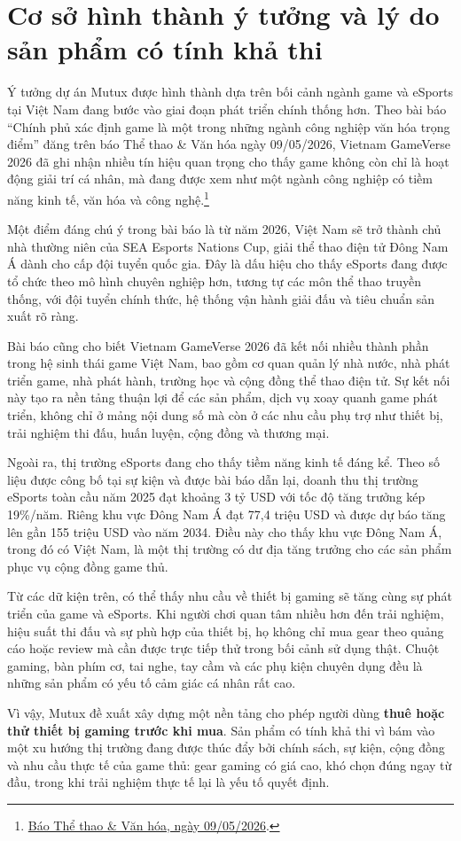 \section{Cơ sở hình thành ý tưởng và lý do sản phẩm có tính khả thi}

Ý tưởng dự án Mutux được hình thành dựa trên bối cảnh ngành game và eSports tại Việt Nam đang bước vào giai đoạn phát triển chính thống hơn. Theo bài báo ``Chính phủ xác định game là một trong những ngành công nghiệp văn hóa trọng điểm'' đăng trên báo Thể thao \& Văn hóa ngày 09/05/2026, Vietnam GameVerse 2026 đã ghi nhận nhiều tín hiệu quan trọng cho thấy game không còn chỉ là hoạt động giải trí cá nhân, mà đang được xem như một ngành công nghiệp có tiềm năng kinh tế, văn hóa và công nghệ.\footnote{\href{https://thethaovanhoa.vn/chinh-phu-xac-dinh-game-la-mot-trong-nhung-nganh-cong-nghiep-van-hoa-trong-diem-20260509142546065.htm}{Báo Thể thao \& Văn hóa, ngày 09/05/2026}.}

Một điểm đáng chú ý trong bài báo là từ năm 2026, Việt Nam sẽ trở thành chủ nhà thường niên của SEA Esports Nations Cup, giải thể thao điện tử Đông Nam Á dành cho cấp đội tuyển quốc gia. Đây là dấu hiệu cho thấy eSports đang được tổ chức theo mô hình chuyên nghiệp hơn, tương tự các môn thể thao truyền thống, với đội tuyển chính thức, hệ thống vận hành giải đấu và tiêu chuẩn sản xuất rõ ràng.

Bài báo cũng cho biết Vietnam GameVerse 2026 đã kết nối nhiều thành phần trong hệ sinh thái game Việt Nam, bao gồm cơ quan quản lý nhà nước, nhà phát triển game, nhà phát hành, trường học và cộng đồng thể thao điện tử. Sự kết nối này tạo ra nền tảng thuận lợi để các sản phẩm, dịch vụ xoay quanh game phát triển, không chỉ ở mảng nội dung số mà còn ở các nhu cầu phụ trợ như thiết bị, trải nghiệm thi đấu, huấn luyện, cộng đồng và thương mại.

Ngoài ra, thị trường eSports đang cho thấy tiềm năng kinh tế đáng kể. Theo số liệu được công bố tại sự kiện và được bài báo dẫn lại, doanh thu thị trường eSports toàn cầu năm 2025 đạt khoảng 3 tỷ USD với tốc độ tăng trưởng kép 19\%/năm. Riêng khu vực Đông Nam Á đạt 77,4 triệu USD và được dự báo tăng lên gần 155 triệu USD vào năm 2034. Điều này cho thấy khu vực Đông Nam Á, trong đó có Việt Nam, là một thị trường có dư địa tăng trưởng cho các sản phẩm phục vụ cộng đồng game thủ.

Từ các dữ kiện trên, có thể thấy nhu cầu về thiết bị gaming sẽ tăng cùng sự phát triển của game và eSports. Khi người chơi quan tâm nhiều hơn đến trải nghiệm, hiệu suất thi đấu và sự phù hợp của thiết bị, họ không chỉ mua gear theo quảng cáo hoặc review mà cần được trực tiếp thử trong bối cảnh sử dụng thật. Chuột gaming, bàn phím cơ, tai nghe, tay cầm và các phụ kiện chuyên dụng đều là những sản phẩm có yếu tố cảm giác cá nhân rất cao.

Vì vậy, Mutux đề xuất xây dựng một nền tảng cho phép người dùng \textbf{thuê hoặc thử thiết bị gaming trước khi mua}. Sản phẩm có tính khả thi vì bám vào một xu hướng thị trường đang được thúc đẩy bởi chính sách, sự kiện, cộng đồng và nhu cầu thực tế của game thủ: gear gaming có giá cao, khó chọn đúng ngay từ đầu, trong khi trải nghiệm thực tế lại là yếu tố quyết định.
